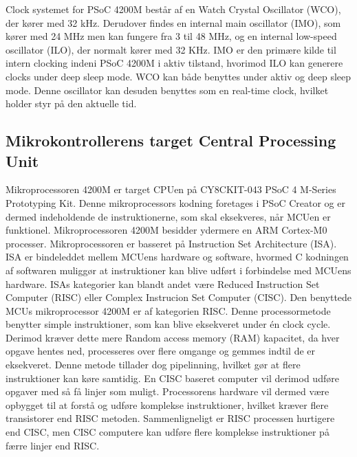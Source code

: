 Clock systemet for PSoC 4200M består af en Watch Crystal Oscillator (WCO), der kører med 32 kHz. Derudover findes en internal main oscillator (IMO), som kører med 24 MHz men kan fungere fra 3 til 48 MHz, og en internal low-speed oscillator (ILO), der normalt kører med 32 KHz. IMO er den primære kilde til intern clocking indeni PSoC 4200M i aktiv tilstand, hvorimod ILO kan generere clocks under deep sleep mode. WCO kan både benyttes under aktiv og deep sleep mode. Denne oscillator kan desuden benyttes som en real-time clock, hvilket holder styr på den aktuelle tid. \citep{Semiconductor20164200M}

\subsection{Mikrokontrollerens target Central Processing Unit}
Mikroprocessoren 4200M er target CPUen på CY8CKIT-043 PSoC 4 M-Series Prototyping Kit. Denne mikroprocessors kodning foretages i PSoC Creator og er dermed indeholdende de instruktionerne, som skal eksekveres, når MCUen er funktionel. Mikroprocessoren 4200M besidder ydermere en ARM Cortex-M0 processer. \newline
Mikroprocessoren er basseret på Instruction Set Architecture (ISA). ISA er bindeleddet mellem MCUens hardware og software, hvormed C kodningen af softwaren muliggør at instruktioner kan blive udført i forbindelse med MCUens hardware. ISAs kategorier kan blandt andet være Reduced Instruction Set Computer (RISC) eller Complex Instrucion Set Computer (CISC). \citep{CYPRESS2016Cortexm0,Semiconductor20164200M,Yadav2016} \newline
Den benyttede MCUs mikroprocessor 4200M er af kategorien RISC. Denne processormetode benytter simple instruktioner, som kan blive eksekveret under én clock cycle. Derimod kræver dette mere Random access memory (RAM) kapacitet, da hver opgave hentes ned, processeres over flere omgange og gemmes indtil de er eksekveret. Denne metode tillader dog pipelinning, hvilket gør at flere instruktioner kan køre samtidig. En CISC baseret computer vil derimod udføre opgaver med så få linjer som muligt. Processorens hardware vil dermed være opbygget til at forstå og udføre komplekse instruktioner, hvilket kræver flere transistorer end RISC metoden.  Sammenligneligt er RISC processen hurtigere end CISC, men CISC computere kan udføre flere komplekse instruktioner på færre linjer end RISC. \citep{CYPRESS2016Cortexm0,Semiconductor20164200M,Yadav2016}\\
